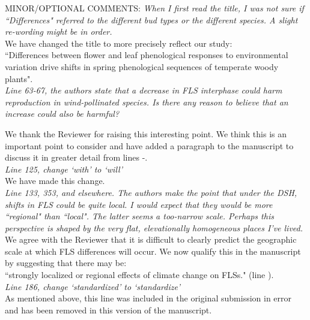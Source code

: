 \documentclass[11pt]{article}
\begin{document}
MINOR/OPTIONAL COMMENTS:
\emph{When I first read the title, I was not sure if ``Differences" referred to the different bud types or the different species. A slight re-wording might be in order.}\\


\noindent We have changed the title to more precisely reflect our study:\\
``Differences between flower and leaf phenological responses to environmental variation drive shifts in spring phenological sequences of temperate woody plants".\\

\emph{Line 63-67, the authors state that a decrease in FLS interphase could harm reproduction in wind-pollinated species. Is there any reason to believe that an increase could also be harmful?}

\noindent We thank the Reviewer for raising this interesting point. We think this is an important point to consider and have added a paragraph to the manuscript to discuss it in greater detail from lines -. \\

\emph{Line 125, change `with' to `will'}\\

\noindent We have made this change.\\


\emph{Line 133, 353, and elsewhere. The authors make the point that under the DSH, shifts in FLS could be quite local. I would expect that they would be more ``regional" than ``local". The latter seems a too-narrow scale. Perhaps this perspective is shaped by the very flat, elevationally homogeneous places I've lived.}\\

\noindent We agree with the Reviewer that it is difficult to clearly predict the geographic scale at which FLS differences will occur. We now qualify this in the manuscript by suggesting that there may be:\\

``strongly localized or regional effects of climate change on FLSs." (line ).\\

\emph{Line 186, change `standardized' to `standardize'}\\

\noindent As mentioned above, this line was included in the original submission in error and has been removed in this version of the manuscript.\\
\end{document}
